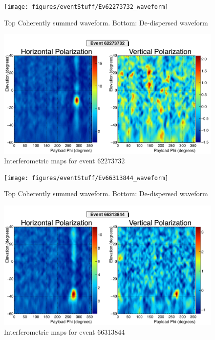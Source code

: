 		\begin{figure}
		\centering
			\texttt{[image: figures/eventStuff/Ev62273732\_waveform]}
			\caption{Top Coherently summed waveform.  Bottom: De-dispersed waveform} 
		\label{fig:Ev62273732_waveform}
		\end{figure}
			
		\begin{figure}
		\centering
			\includegraphics[width=\textwidth]{figures/intMap/intMap_ev62273732}
			\caption{Interferometric maps for event 62273732} 
		\label{fig:Ev62273732_map}
		\end{figure}	
	
		\begin{figure}
		\centering
			\texttt{[image: figures/eventStuff/Ev66313844\_waveform]}
			\caption{Top Coherently summed waveform.  Bottom: De-dispersed waveform} 
		\label{fig:Ev66313844_waveform}
		\end{figure}
		
		\begin{figure}
		\centering
			\includegraphics[width=\textwidth]{figures/intMap/intMap_ev66313844}
			\caption{Interferometric maps for event 66313844} 
		\label{fig:Ev66313844_map}
		\end{figure}			
	
